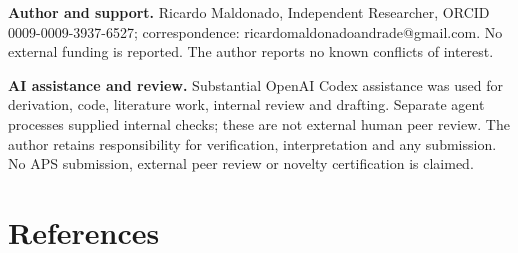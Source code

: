 \documentclass[
  10pt,
]{article}
\begin{document}
\textbf{Author and support.} Ricardo Maldonado, Independent Researcher,
ORCID 0009-0009-3937-6527; correspondence:
ricardomaldonadoandrade@gmail.com. No external funding is reported. The
author reports no known conflicts of interest.

\textbf{AI assistance and review.} Substantial OpenAI Codex assistance
was used for derivation, code, literature work, internal review and
drafting. Separate agent processes supplied internal checks; these are
not external human peer review. The author retains responsibility for
verification, interpretation and any submission. No APS submission,
external peer review or novelty certification is claimed.

\section{References}\label{references}
\end{document}
